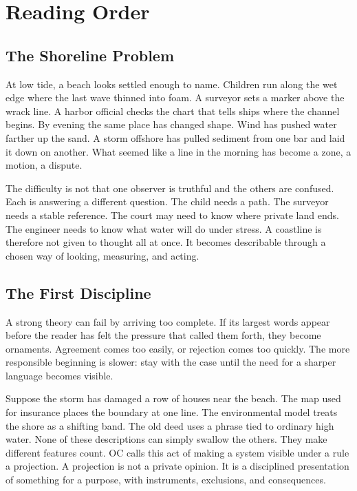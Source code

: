 \documentclass[11pt,a4paper,openany]{book}
\begin{document}
\section{Reading Order}
\subsection{The Shoreline Problem}
At low tide, a beach looks settled enough to name. Children run along the wet edge where the last wave thinned into foam. A surveyor sets a marker above the wrack line. A harbor official checks the chart that tells ships where the channel begins. By evening the same place has changed shape. Wind has pushed water farther up the sand. A storm offshore has pulled sediment from one bar and laid it down on another. What seemed like a line in the morning has become a zone, a motion, a dispute. \cite{grimmett_percolation,goldenfeld_lectures}\par
The difficulty is not that one observer is truthful and the others are confused. Each is answering a different question. The child needs a path. The surveyor needs a stable reference. The court may need to know where private land ends. The engineer needs to know what water will do under stress. A coastline is therefore not given to thought all at once. It becomes describable through a chosen way of looking, measuring, and acting.\par
\subsection{The First Discipline}
A strong theory can fail by arriving too complete. If its largest words appear before the reader has felt the pressure that called them forth, they become ornaments. Agreement comes too easily, or rejection comes too quickly. The more responsible beginning is slower: stay with the case until the need for a sharper language becomes visible. \cite{grimmett_percolation,goldenfeld_lectures}\par
Suppose the storm has damaged a row of houses near the beach. The map used for insurance places the boundary at one line. The environmental model treats the shore as a shifting band. The old deed uses a phrase tied to ordinary high water. None of these descriptions can simply swallow the others. They make different features count. OC calls this act of making a system visible under a rule a projection. A projection is not a private opinion. It is a disciplined presentation of something for a purpose, with instruments, exclusions, and consequences.\par
\end{document}
